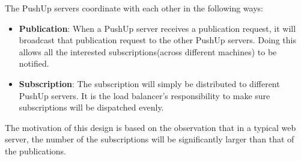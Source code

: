 The PushUp servers coordinate with each other in the following ways:

\begin{itemize}
    \item {\bf Publication}: When a PushUp server receives a publication request, it
          will broadcast that publication request to the other PushUp servers. Doing
          this allows all the interested subscriptions(across different machines) to 
          be notified.
    \item {\bf Subscription}: The subscription will simply be distributed to different
          PushUp servers. It is the load balancer's responsibility to make sure 
          subscriptions will be dispatched evenly.
\end{itemize}

The motivation of this design is based on the observation that in a typical web server,
the number of the subscriptions will be significantly larger than that of the 
publications.

